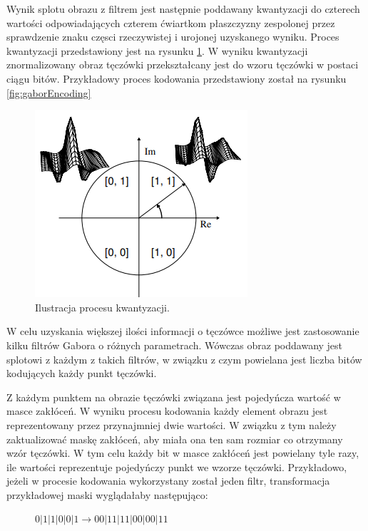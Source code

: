 \documentclass[10pt,polish,a4paper,oneside]{ppfcmthesis}
\begin{document}
Wynik splotu obrazu z filtrem jest następnie poddawany kwantyzacji \cite{DaugmanHowIrisRecognitionWorks} do czterech wartości odpowiadających
czterem \'cwiartkom płaszczyzny zespolonej przez sprawdzenie znaku częsci rzeczywistej i urojonej
uzyskanego wyniku. Proces kwantyzacji przedstawiony jest na rysunku \ref{fig:encodingQuant}. W wyniku
kwantyzacji znormalizowany obraz tęczówki przekształcany jest do wzoru tęczówki w postaci ciągu bitów.
Przykładowy proces kodowania przedstawiony został na rysunku \ref{fig:gaborEncoding}

\begin{figure}[ht]
  \centering
  \includegraphics{images/encoding/quantization.png}
  \caption{Ilustracja procesu kwantyzacji.}
  \label{fig:encodingQuant}
\end{figure}

W celu uzyskania większej ilości informacji o tęczówce możliwe jest zastosowanie kilku filtrów
Gabora o różnych parametrach. Wówczas obraz poddawany jest splotowi z każdym z takich filtrów, w
związku z czym powielana jest liczba bitów kodujących każdy punkt tęczówki.

Z każdym punktem na obrazie tęczówki związana jest pojedyńcza wartoś\'c w masce zakłóceń. W wyniku
procesu kodowania każdy element obrazu jest reprezentowany przez przynajmniej dwie wartości. W związku
z tym należy zaktualizowa\'c maskę zakłóceń, aby miała ona ten sam rozmiar co otrzymany wzór tęczówki.
W tym celu każdy bit w masce zakłóceń jest powielany tyle razy, ile wartości reprezentuje pojedyńczy
punkt we wzorze tęczówki. Przykładowo, jeżeli w procesie kodowania wykorzystany został jeden filtr,
transformacja przykładowej maski wyglądałaby następująco:

\begin{figure}[ht]
  \centering
  $0|1|1|0|0|1 \rightarrow 00|11|11|00|00|11$
\end{figure}
\end{document}
